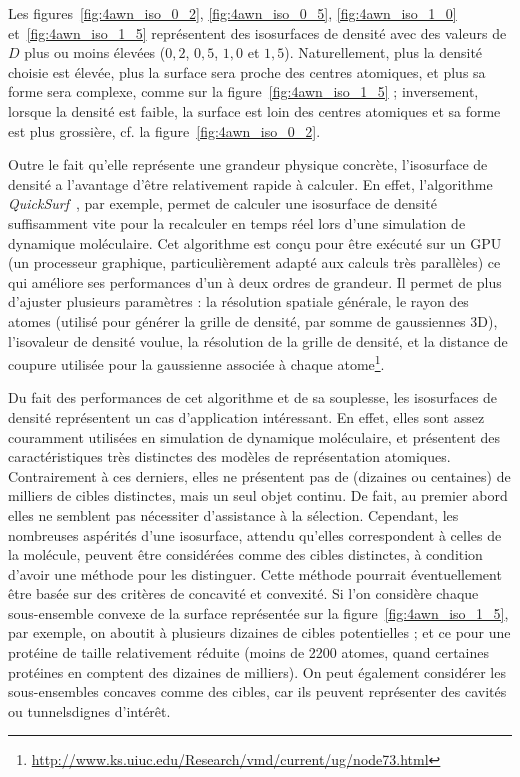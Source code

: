 	Les figures~\ref{fig:4awn_iso_0_2}, \ref{fig:4awn_iso_0_5}, \ref{fig:4awn_iso_1_0} et~\ref{fig:4awn_iso_1_5} représentent des isosurfaces de densité avec des valeurs de $D$ plus ou moins élevées ($0,2$, $0,5$, $1,0$ et $1,5$). Naturellement, plus la densité choisie est élevée, plus la surface sera proche des centres atomiques, et plus sa forme sera complexe, comme sur la figure~\ref{fig:4awn_iso_1_5} ; inversement, lorsque la densité est faible, la surface est loin des centres atomiques et sa forme est plus grossière, cf. la figure~\ref{fig:4awn_iso_0_2}.
	
	Outre le fait qu'elle représente une grandeur physique concrète, l'isosurface de densité a l'avantage d'être relativement rapide à calculer. En effet, l'algorithme \emph{QuickSurf}~\cite{krone2012fast, roberts2013lattice, stone2013early, stone2013gpu, stone2014gpu, sener2014visualization}, par exemple, permet de calculer une isosurface de densité suffisamment vite pour la recalculer en temps réel lors d'une simulation de dynamique moléculaire. Cet algorithme est conçu pour être exécuté sur un GPU (un processeur graphique, particulièrement adapté aux calculs très parallèles) ce qui améliore ses performances d'un à deux ordres de grandeur. Il permet de plus d'ajuster plusieurs paramètres : la résolution spatiale générale, le rayon des atomes (utilisé pour générer la grille de densité, par somme de gaussiennes 3D), l'isovaleur de densité voulue, la résolution de la grille de densité, et la distance de coupure utilisée pour la gaussienne associée à chaque atome\footnote{\url{http://www.ks.uiuc.edu/Research/vmd/current/ug/node73.html}}.
	
	Du fait des performances de cet algorithme et de sa souplesse, les isosurfaces de densité représentent un cas d'application intéressant. En effet, elles sont assez couramment utilisées en simulation de dynamique moléculaire, et présentent des caractéristiques très distinctes des modèles de représentation atomiques. Contrairement à ces derniers, elles ne présentent pas de (dizaines ou centaines) de milliers de cibles distinctes, mais un seul objet continu. De fait, au premier abord elles ne semblent pas nécessiter d'assistance à la sélection. Cependant, les nombreuses aspérités d'une isosurface, attendu qu'elles correspondent à celles de la molécule, peuvent être considérées comme des cibles distinctes, à condition d'avoir une méthode pour les distinguer. Cette méthode pourrait éventuellement être basée sur des critères de concavité et convexité. Si l'on considère chaque sous-ensemble convexe de la surface représentée sur la figure~\ref{fig:4awn_iso_1_5}, par exemple, on aboutit à plusieurs dizaines de cibles potentielles ; et ce pour une protéine de taille relativement réduite (moins de 2200 atomes, quand certaines protéines en comptent des dizaines de milliers). On peut également considérer les sous-ensembles concaves comme des cibles, car ils peuvent représenter des cavités ou tunnels\footnotemark dignes d'intérêt.
	
